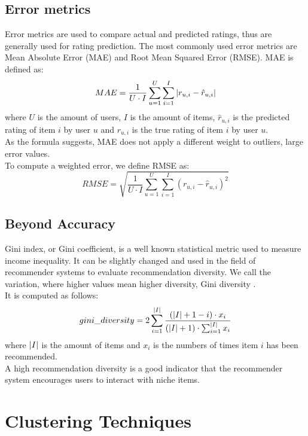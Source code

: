 \subsection{Error metrics}

Error metrics are used to compare actual and predicted ratings, thus are generally used for rating prediction. The most commonly used error metrics are Mean Absolute Error (MAE) and Root Mean Squared Error (RMSE).
MAE is defined as:
\begin{equation*}
MAE = \frac{1}{U \cdot I} \sum_{u=1}^{U} \sum_{i=1}^{I} \left\lvert r_{u,i} - \hat{r}_{u,i}\right\rvert
\end{equation*}
where $U$ is the amount of users, $I$ is the amount of items, $\hat{r}_{u,i}$ is the predicted rating of item $i$ by user $u$ and $r_{u,i}$ is the true rating of item $i$ by user $u$.\\
As the formula suggests, MAE does not apply a different weight to outliers, large error values.\\
To compute a weighted error, we define RMSE as:
\begin{equation*}
RMSE = \sqrt{\frac{1}{U \cdot I} \sum_{u=1}^{U} \sum_{i=1}^{I} (r_{u,i} - \hat{r}_{u,i})^2}
\end{equation*}


\subsection{Beyond Accuracy}

Gini index, or Gini coefficient, is a well known statistical metric used to measure income inequality. It can be slightly changed and used in the field of recommender systems to evaluate recommendation diversity. We call the variation, where higher values mean higher diversity, Gini diversity \cite{diversity}.\\
It is computed as follows:
\begin{equation*}
gini\_diversity = 2 \sum_{i=1}^{\left\lvert I\right\rvert} \frac{(\left\lvert I\right\rvert + 1 - i) \cdot x_i}{(\left\lvert I\right\rvert + 1) \cdot \sum_{i=1}^{\left\lvert I\right\rvert} x_i}
\end{equation*}
where $\left\lvert I\right\rvert$ is the amount of items and $x_i$ is the numbers of times item $i$ has been recommended.\\
A high recommendation diversity is a good indicator that the recommender system encourages users to interact with niche items.



\section{Clustering Techniques}

